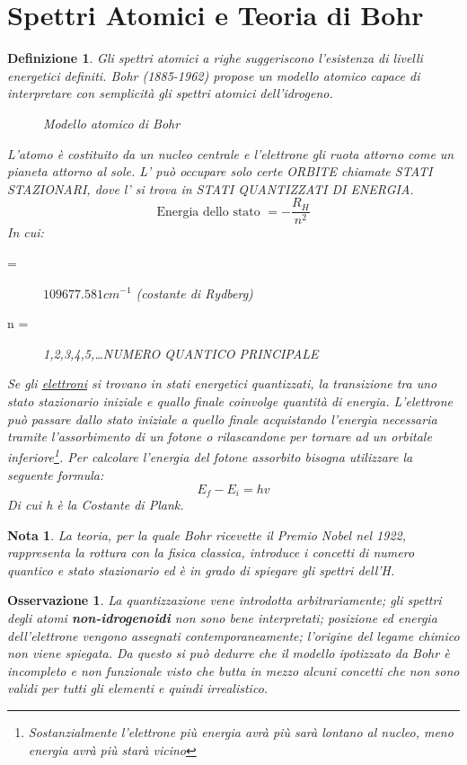 \documentclass{book}
\newtheorem{defi}{Definizione}[section]
\newtheorem{nota}{Nota}[section]
\newtheorem{oss}{Osservazione}[section]
\begin{document}
\section{Spettri Atomici e Teoria di Bohr}
\label{sec:atomodiBohr}
\begin{defi}
  Gli spettri atomici a righe suggeriscono l'esistenza di livelli energetici definiti. Bohr (1885-1962) propose un modello atomico capace di interpretare con semplicità gli spettri atomici dell'idrogeno.
  \begin{figure}[ht!]
    \centering  
    \caption{Modello atomico di Bohr}
    \label{fig:Modatombohr}
  \end{figure}

  L'atomo è costituito da un nucleo centrale e l'elettrone gli ruota attorno come un pianeta attorno
  al sole. L' può occupare solo certe ORBITE chiamate STATI STAZIONARI, dove l' si trova in STATI
  QUANTIZZATI DI ENERGIA.
  \begin{equation}
    \label{eq:energiastato}
    \text{Energia dello stato } = -\frac{R_H}{n^2}
  \end{equation}
  In cui:
  \begin{description}
  \item[ =] $109677.581cm^{-1}$ (costante di Rydberg)
  \item[n =] 1,2,3,4,5,\dots NUMERO QUANTICO PRINCIPALE
  \end{description}
  Se gli \underline{elettroni} si trovano in stati energetici quantizzati, la transizione tra uno stato stazionario
  iniziale e quallo finale coinvolge quantità di energia. L'elettrone può passare dallo stato iniziale a quello
  finale {\color{blue}acquistando l'energia necessaria tramite l'assorbimento di un fotone o rilascandone per
    tornare ad un orbitale inferiore}\footnote{Sostanzialmente l'elettrone più energia avrà più sarà lontano al
    nucleo, meno energia avrà più starà vicino}.
  Per calcolare l'energia del fotone assorbito bisogna utilizzare la seguente formula:
  \begin{equation}
    \label{eq:energiafotoneassorbito}
    E_f-E_i=hv
  \end{equation}
  Di cui h è la Costante di Plank. 
\end{defi}
\begin{nota}
  La teoria, per la quale Bohr ricevette il Premio Nobel nel 1922, rappresenta la rottura con la fisica classica,
  introduce i concetti di numero quantico e stato stazionario ed è in grado di spiegare gli spettri dell’H.
\end{nota}
\begin{oss}
  La quantizzazione vene introdotta arbitrariamente; gli spettri degli atomi \textbf{non-idrogenoidi} non sono
  bene interpretati; posizione ed energia dell'elettrone vengono assegnati contemporaneamente; l'origine del legame
  chimico non viene spiegata. Da questo si può dedurre che il modello ipotizzato da Bohr è incompleto e non
  funzionale visto che butta in mezzo alcuni concetti che non sono validi per tutti gli elementi e quindi
  irrealistico.
\end{oss}
\end{document}
